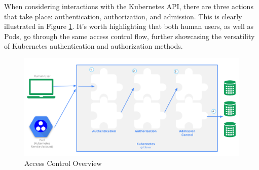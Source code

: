 \documentclass[a4paper,11pt,openright,BCOR=15mm]{scrbook}
\begin{document}
%
%
%
%
%
%
%

When considering interactions with the Kubernetes API, there are three actions that take place: authentication, authorization, and admission. This is clearly illustrated in Figure \ref{fig:authflow}. It's worth highlighting that both human users, as well as Pods, go through the same access control flow, further showcasing the versatility of Kubernetes authentication and authorization methods.

\begin{figure}[h!]
	\centering
	\label{fig:authflow}
	\includegraphics[scale=0.3]{figs/access-control-overview.png}
	\caption{Access Control Overview \cite{the_linux_foundation_controlling_2023}}
\end{figure}
\end{document}
